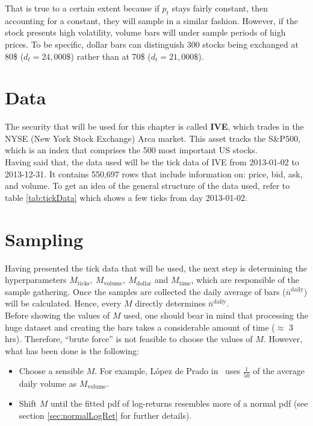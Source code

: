 That is true to a certain extent because if $p_t$ stays fairly constant, 
then accounting for a constant, they will sample in a similar fashion. 
However, if the stock presents high volatility, volume bars will under 
sample periods of high prices. To be specific, dollar bars can distinguish 
300 stocks being exchanged at 80\$ ($ d_t = 24,000\$ $) rather than at 70\$ 
($ d_t = 21,000\$ $).\\

\section{Data}
The security that will be used for this chapter is called \textbf{IVE}, 
which trades in the NYSE (New York Stock Exchange) Arca market. This asset 
tracks the S\&P500, which is an index that comprises the 500 most important 
US stocks.\\

Having said that, the data used will be the tick data of IVE from 2013-01-02 
to 2013-12-31. It contains 550,697 rows that include information on: price, 
bid, ask, and volume. To get an idea of the general structure of the data 
used, refer to table \ref{tab:tickData} which shows a few ticks from day 
2013-01-02.

\section{Sampling}
Having presented the tick data that will be used, the next step is 
determining the hyperparameters $M_{\text{ticks}},\ M_{\text{volume}},\ 
M_{\text{dollar}}$ and $M_{\text{time}}$, which are responsible of the 
sample gathering. Once the samples are collected the daily average of bars 
($\bar{n}^{\text{daily}}$) will be calculated. Hence, every $M$ directly 
determines $\bar{n}^{\text{daily}}$.\\

Before showing the values of $M$ used, one should bear in mind that 
processing the huge dataset and creating the bars takes a considerable 
amount of time ($\approx$ 3 hrs). Therefore, ``brute force'' is not feasible 
to choose the values of $M$. However, what has been done is the following:

\begin{itemize}
	\item Choose a sensible $M$. For example, López de Prado 
	in~\cite{volumeClock} uses $\frac{1}{50}$ of the average daily volume as
	$M_{\text{volume}}$.

	\item Shift $M$ until the fitted pdf of log-returns resembles more of a 
	normal pdf (see section \ref{sec:normalLogRet} for further details).
\end{itemize}

